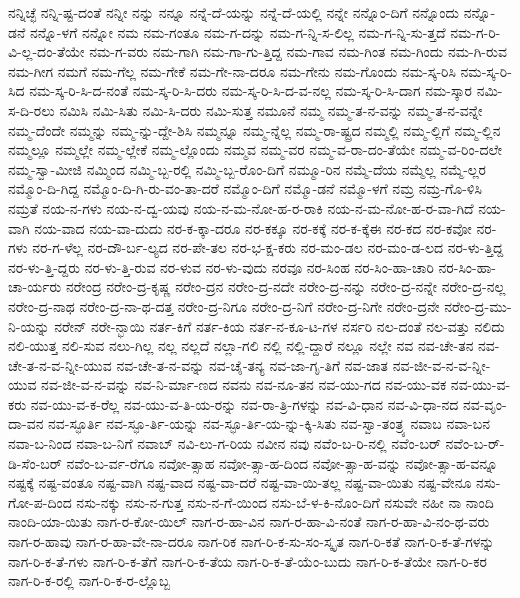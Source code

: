 {ನನ್ನಿಚ್ಛೆ
ನನ್ನಿ-ಷ್ಟ-ದಂತೆ
ನನ್ನೀ
ನನ್ನು
ನನ್ನೂ
ನನ್ನೆ-ದೆ-ಯನ್ನು
ನನ್ನೆ-ದೆ-ಯಲ್ಲಿ
ನನ್ನೇ
ನನ್ನೊಂ-ದಿಗೆ
ನನ್ನೊಂದು
ನನ್ನೊ-ಡನೆ
ನನ್ನೊ-ಳಗೆ
ನನ್ನೋ
ನಮ
ನಮ-ಗಂತೂ
ನಮ-ಗ-ದನ್ನು
ನಮ-ಗ-ನ್ನಿ-ಸ-ಲಿಲ್ಲ
ನಮ-ಗ-ನ್ನಿ-ಸು-ತ್ತದೆ
ನಮ-ಗ-ರಿ-ವಿ-ಲ್ಲ-ದಂ-ತೆಯೇ
ನಮ-ಗ-ವರು
ನಮ-ಗಾಗಿ
ನಮ-ಗಾ-ಗು-ತ್ತಿದ್ದ
ನಮ-ಗಾವ
ನಮ-ಗಿಂತ
ನಮ-ಗಿಂದು
ನಮ-ಗಿ-ರುವ
ನಮ-ಗೀಗ
ನಮಗೆ
ನಮ-ಗೆಲ್ಲ
ನಮ-ಗೇಕೆ
ನಮ-ಗೇ-ನಾ-ದರೂ
ನಮ-ಗೇನು
ನಮ-ಗೊಂದು
ನಮ-ಸ್ಕ-ರಿಸಿ
ನಮ-ಸ್ಕ-ರಿ-ಸಿದ
ನಮ-ಸ್ಕ-ರಿ-ಸಿ-ದ-ನಂತೆ
ನಮ-ಸ್ಕ-ರಿ-ಸಿ-ದರು
ನಮ-ಸ್ಕ-ರಿ-ಸಿ-ದ-ವ-ನಲ್ಲ
ನಮ-ಸ್ಕ-ರಿ-ಸಿ-ದಾಗ
ನಮ-ಸ್ಕಾರ
ನಮಿ-ಸ-ದಿ-ರಲು
ನಮಿಸಿ
ನಮಿ-ಸಿತು
ನಮಿ-ಸಿ-ದರು
ನಮಿ-ಸುತ್ತ
ನಮೂನೆ
ನಮ್ಮ
ನಮ್ಮ-ತ-ನ-ವನ್ನು
ನಮ್ಮ-ತ-ನ-ವನ್ನೇ
ನಮ್ಮ-ದೆಂದೇ
ನಮ್ಮನ್ನು
ನಮ್ಮ-ನ್ನು-ದ್ದೇ-ಶಿಸಿ
ನಮ್ಮನ್ನೂ
ನಮ್ಮ-ನ್ನೆಲ್ಲ
ನಮ್ಮ-ರಾ-ಷ್ಟ್ರದ
ನಮ್ಮಲ್ಲಿ
ನಮ್ಮ-ಲ್ಲಿಗೆ
ನಮ್ಮ-ಲ್ಲಿನ
ನಮ್ಮಲ್ಲೂ
ನಮ್ಮಲ್ಲೇ
ನಮ್ಮ-ಲ್ಲೇಕೆ
ನಮ್ಮ-ಲ್ಲೊಂದು
ನಮ್ಮವ
ನಮ್ಮ-ವರ
ನಮ್ಮ-ವ-ರಾ-ದಂ-ತೆಯೇ
ನಮ್ಮ-ವ-ರಿಂ-ದಲೇ
ನಮ್ಮ-ಸ್ವಾ-ಮೀಜಿ
ನಮ್ಮಿಂದ
ನಮ್ಮಿ-ಬ್ಬ-ರಲ್ಲಿ
ನಮ್ಮಿ-ಬ್ಬ-ರೊಂ-ದಿಗೆ
ನಮ್ಮೂ-ರಿನ
ನಮ್ಮೆ-ದೆಯ
ನಮ್ಮೆಲ್ಲ
ನಮ್ಮೆ-ಲ್ಲರ
ನಮ್ಮೊಂ-ದಿ-ಗಿದ್ದ
ನಮ್ಮೊಂ-ದಿ-ಗಿ-ರು-ವಂ-ತಾ-ದರೆ
ನಮ್ಮೊಂ-ದಿಗೆ
ನಮ್ಮೊ-ಡನೆ
ನಮ್ಮೊ-ಳಗೆ
ನಮ್ರ
ನಮ್ರ-ಗೊ-ಳಿಸಿ
ನಮ್ರತೆ
ನಯ-ನ-ಗಳು
ನಯ-ನ-ದ್ವ-ಯವು
ನಯ-ನ-ಮ-ನೋ-ಹ-ರ-ರಾಕಿ
ನಯ-ನ-ಮ-ನೋ-ಹ-ರ-ವಾ-ಗಿದೆ
ನಯ-ವಾಗಿ
ನಯ-ವಾದ
ನಯ-ವಾ-ದುದು
ನರ-ಕ-ಕ್ಕಾ-ದರೂ
ನರ-ಕಕ್ಕೂ
ನರ-ಕಕ್ಕೆ
ನರ-ಕ-ಕ್ಕೆಈ
ನರ-ಕದ
ನರ-ಕವೋ
ನರ-ಗಳು
ನರ-ಗ-ಳೆಲ್ಲ
ನರ-ದೌ-ರ್ಬ-ಲ್ಯದ
ನರ-ಪೇ-ತಲ
ನರ-ಭ-ಕ್ಷ-ಕರು
ನರ-ಮಂ-ಡಲ
ನರ-ಮಂ-ಡ-ಲದ
ನರ-ಳು-ತ್ತಿದ್ದ
ನರ-ಳು-ತ್ತಿ-ದ್ದರು
ನರ-ಳು-ತ್ತಿ-ರುವ
ನರ-ಳುವ
ನರ-ಳು-ವುದು
ನರವೂ
ನರ-ಸಿಂಹ
ನರ-ಸಿಂ-ಹಾ-ಚಾರಿ
ನರ-ಸಿಂ-ಹಾ-ಚಾ-ರ್ಯರು
ನರೇಂದ್ರ
ನರೇಂ-ದ್ರ-ಕೃಷ್ಣ
ನರೇಂ-ದ್ರನ
ನರೇಂ-ದ್ರ-ನದೇ
ನರೇಂ-ದ್ರ-ನನ್ನು
ನರೇಂ-ದ್ರ-ನನ್ನೇ
ನರೇಂ-ದ್ರ-ನಲ್ಲ
ನರೇಂ-ದ್ರ-ನಾಥ
ನರೇಂ-ದ್ರ-ನಾ-ಥ-ದತ್ತ
ನರೇಂ-ದ್ರ-ನಿಗೂ
ನರೇಂ-ದ್ರ-ನಿಗೆ
ನರೇಂ-ದ್ರ-ನಿಗೇ
ನರೇಂ-ದ್ರನೇ
ನರೇಂ-ದ್ರ-ಮು-ನಿ-ಯನ್ನು
ನರೇನ್
ನರೇ-ನ್ಭಾಯಿ
ನರ್ತ-ಕಿಗೆ
ನರ್ತ-ಕಿಯ
ನರ್ತ-ನ-ಕೂ-ಟ-ಗಳ
ನರ್ಸರಿ
ನಲ-ದಂತೆ
ನಲ-ವತ್ತು
ನಲಿದು
ನಲಿ-ಯುತ್ತ
ನಲಿ-ಸುವ
ನಲು-ಗಿಲ್ಲ
ನಲ್ಲ
ನಲ್ಲದೆ
ನಲ್ಲಾ-ಗಲಿ
ನಲ್ಲಿ
ನಲ್ಲಿ-ದ್ದಾರೆ
ನಲ್ಲೂ
ನಲ್ಲೇ
ನವ
ನವ-ಚೇ-ತನ
ನವ-ಚೇ-ತ-ನ-ವ-ನ್ನೀ-ಯುವ
ನವ-ಚೇ-ತ-ನ-ವನ್ನು
ನವ-ಚೈ-ತನ್ಯ
ನವ-ಜಾ-ಗೃ-ತಿಗೆ
ನವ-ಜಾತ
ನವ-ಜೀ-ವ-ನ-ವ-ನ್ನೀ-ಯುವ
ನವ-ಜೀ-ವ-ನ-ವನ್ನು
ನವ-ನಿ-ರ್ಮಾ-ಣದ
ನವನು
ನವ-ನೂ-ತನ
ನವ-ಯು-ಗದ
ನವ-ಯು-ವಕ
ನವ-ಯು-ವ-ಕರು
ನವ-ಯು-ವ-ಕ-ರೆಲ್ಲ
ನವ-ಯು-ವ-ತಿ-ಯ-ರನ್ನು
ನವ-ರಾ-ತ್ರಿ-ಗಳನ್ನು
ನವ-ವಿ-ಧಾನ
ನವ-ವಿ-ಧಾ-ನದ
ನವ-ವೃಂ-ದಾ-ವನ
ನವ-ಸ್ಫೂರ್ತಿ
ನವ-ಸ್ಫೂ-ರ್ತಿ-ಯನ್ನು
ನವ-ಸ್ಫೂ-ರ್ತಿ-ಯ-ನ್ನು-ಕ್ಕಿ-ಸಿತು
ನವ-ಸ್ವಾ-ತಂತ್ರ್ಯ
ನವಾಬ
ನವಾ-ಬನ
ನವಾ-ಬ-ನಿಂದ
ನವಾ-ಬ-ನಿಗೆ
ನವಾಬ್
ನವಿ-ಲು-ಗ-ರಿಯ
ನವೀನ
ನವು
ನವೆಂ-ಬ-ರಿ-ನಲ್ಲಿ
ನವೆಂ-ಬರ್
ನವೆಂ-ಬ-ರ್-ಡಿ-ಸೆಂ-ಬರ್
ನವೆಂ-ಬ-ರ್ವ-ರೆಗೂ
ನವೋ-ತ್ಸಾಹ
ನವೋ-ತ್ಸಾ-ಹ-ದಿಂದ
ನವೋ-ತ್ಸಾ-ಹ-ವನ್ನು
ನವೋ-ತ್ಸಾ-ಹ-ವನ್ನೂ
ನಷ್ಟಕ್ಕೆ
ನಷ್ಟ-ವಂತೂ
ನಷ್ಟ-ವಾಗಿ
ನಷ್ಟ-ವಾದ
ನಷ್ಟ-ವಾ-ದರೆ
ನಷ್ಟ-ವಾ-ಯಿ-ತಲ್ಲ
ನಷ್ಟ-ವಾ-ಯಿತು
ನಷ್ಟ-ವೇನೂ
ನಸು-ಗೋ-ಪ-ದಿಂದ
ನಸು-ನಕ್ಕು
ನಸು-ನ-ಗುತ್ತ
ನಸು-ನ-ಗೆ-ಯಿಂದ
ನಸು-ಬೆ-ಳ-ಕಿ-ನೊಂ-ದಿಗೆ
ನಸುವೇ
ನಹೀ
ನಾ
ನಾಂದಿ
ನಾಂದಿ-ಯಾ-ಯಿತು
ನಾಗ-ರ-ಕೋ-ಯಿಲ್
ನಾಗ-ರ-ಹಾ-ವಿನ
ನಾಗ-ರ-ಹಾ-ವಿ-ನಂತೆ
ನಾಗ-ರ-ಹಾ-ವಿ-ನಂ-ಥ-ವರು
ನಾಗ-ರ-ಹಾವು
ನಾಗ-ರ-ಹಾ-ವೇ-ನಾ-ದರೂ
ನಾಗ-ರಿಕ
ನಾಗ-ರಿ-ಕ-ಸು-ಸಂ-ಸ್ಕೃತ
ನಾಗ-ರಿ-ಕತೆ
ನಾಗ-ರಿ-ಕ-ತೆ-ಗಳನ್ನು
ನಾಗ-ರಿ-ಕ-ತೆ-ಗಳು
ನಾಗ-ರಿ-ಕ-ತೆಗೆ
ನಾಗ-ರಿ-ಕ-ತೆಯ
ನಾಗ-ರಿ-ಕ-ತೆ-ಯೆಂ-ಬುದು
ನಾಗ-ರಿ-ಕ-ತೆಯೇ
ನಾಗ-ರಿ-ಕರ
ನಾಗ-ರಿ-ಕ-ರಲ್ಲಿ
ನಾಗ-ರಿ-ಕ-ರ-ಲ್ಲೊಬ್ಬ
}
